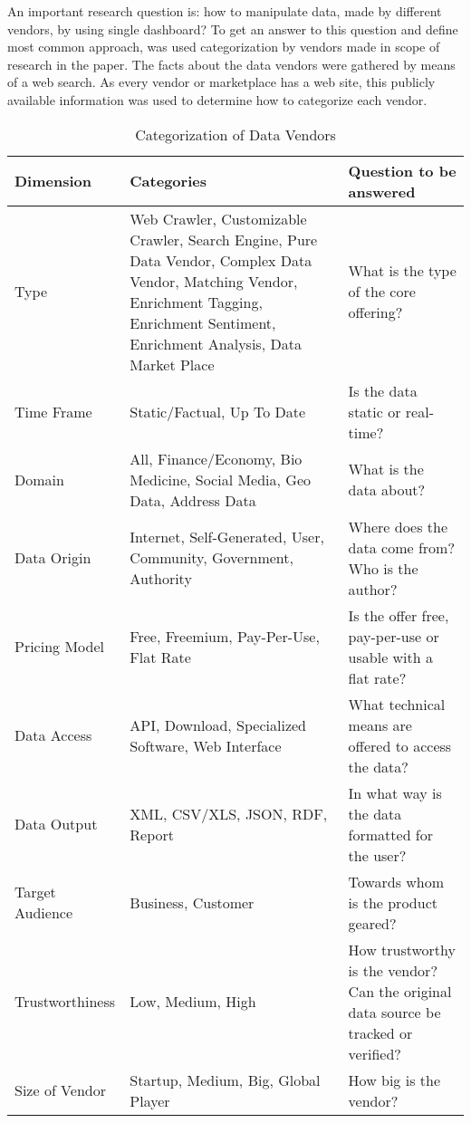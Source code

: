	An important research question is: how to manipulate data, made by different vendors, by using single dashboard? To get an answer to this question and define most common approach, was used categorization by vendors made in scope of research in the paper\cite{schomm2013marketplaces}. The facts about the data vendors were gathered by means of a web search. As every vendor or marketplace has a web site, this publicly available information was used to determine how to categorize each vendor.
	\begin{table}[H]
	\centering
	\begin{tabular}{|L{2.5cm}|L{7cm}|L{6cm}|}
	\hline
	\textbf{Dimension} 			& \textbf{Categories} & \textbf{Question to be answered} \\
	\hline
	\hline 
	Type		                & Web Crawler, Customizable Crawler, Search Engine, Pure Data Vendor, Complex Data Vendor, Matching 
	                                   Vendor, Enrichment Tagging, Enrichment Sentiment, Enrichment Analysis, Data Market Place & What is the type of the core offering?  \\
	\hline
	Time Frame	                & Static/Factual, Up To Date & Is the data static or real-time?  \\
	\hline
	Domain		                & All, Finance/Economy, Bio Medicine, Social Media, Geo Data, Address Data & What is the data about?  \\
	\hline
	Data Origin                 & Internet, Self-Generated, User, Community, Government, Authority & Where does the data come 
	                                       from?Who is the author?  \\
	\hline
	Pricing Model		        & Free, Freemium, Pay-Per-Use, Flat Rate & Is the offer free, pay-per-use or usable with a flat rate? \\
	\hline
	Data Access		            & API, Download, Specialized Software, Web Interface & What technical means are offered to access the data? \\
	\hline
	Data Output		            & XML, CSV/XLS, JSON, RDF, Report& In what way is the data formatted for the user?  \\
	\hline 
	Target Audience		        & Business, Customer & Towards whom is the product geared?  \\
	\hline
	Trustworthiness	            & Low, Medium, High & How trustworthy is the vendor? Can the original data source be tracked or verified?  \\
	\hline 		
	Size of Vendor 		        & Startup, Medium, Big, Global Player & How big is the vendor?  \\
	\hline 
	\end{tabular}
	\caption[Categorization of Data Vendors]{Categorization of Data Vendors}
	\label{tab:categorization}
	\end{table}

